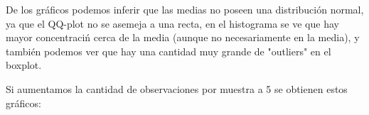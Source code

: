 \documentclass[a4paper]{article}
\begin{document}
\begin{figure}[H]
		\hfill
	\end{figure}
	
	De los gr\'aficos podemos inferir que las medias no poseen una distribuci\'on normal, ya que el QQ-plot no se asemeja a una recta, en el histograma se ve que hay mayor concentraci\'n cerca de la media (aunque no necesariamente en la media), y tambi\'en podemos ver que hay una cantidad muy grande de "outliers" en el boxplot.
	
	Si aumentamos la cantidad de observaciones por muestra a 5 se obtienen estos gr\'aficos:
	
	\begin{figure}[H]
		\centering
	\end{figure}
	
\end{document}
